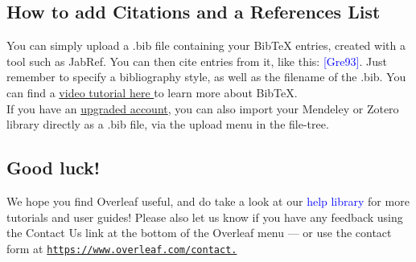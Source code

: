 \documentclass{article}
\begin{document}
\subsection{How to add Citations and a References List}
You can simply upload a .bib file containing your BibTeX entries, created with a tool such as JabRef.
You can then cite entries from it, like this: \textcolor{blue}{[Gre93]}. Just remember to specify a bibliography style, as
well as the filename of the .bib. You can find a \href{https://www.overleaf.com/help/97-how-to-include-a-bibliography-using-bibtex}{video tutorial here } to learn more about BibTeX.\\
If you have an \href{https://www.overleaf.com/user/subscription/plans}{upgraded account}, you can also import your Mendeley or Zotero library directly as
a .bib file, via the upload menu in the file-tree.

\subsection{Good luck!}
We hope you find Overleaf useful, and do take a look at our \textcolor{blue}{help library} for more tutorials and user
guides! Please also let us know if you have any feedback using the Contact Us link at the bottom of
the Overleaf menu — or use the contact form at
\texttt{\href{https://www.overleaf.com/contact}{https://www.overleaf.com/contact.}}




 


\end{document}
